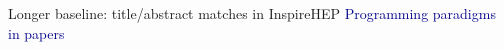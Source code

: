 \documentclass[aspectratio=169]{beamer}
\begin{document}
\begin{frame}{Longer baseline: title/abstract matches in InspireHEP}
\vspace{0.35 cm}
\textcolor{darkblue}{Programming paradigms in  papers}

\begin{columns}
\end{columns}
\end{frame}
\end{document}
